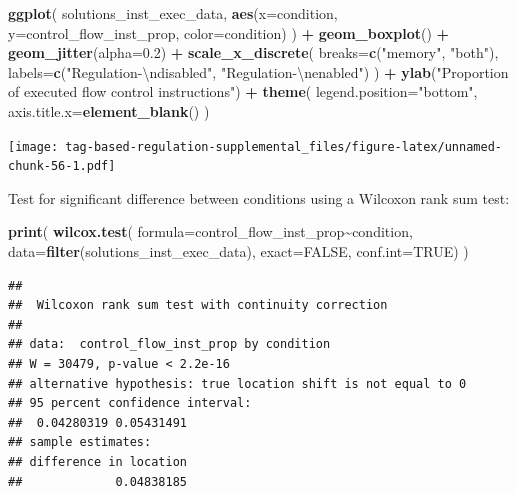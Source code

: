 \documentclass[
]{book}
\newenvironment{Shaded}{\begin{snugshade}}{\end{snugshade}}
\newcommand{\CharTok}[1]{\textcolor[rgb]{0.31,0.60,0.02}{#1}}
\newcommand{\DataTypeTok}[1]{\textcolor[rgb]{0.13,0.29,0.53}{#1}}
\newcommand{\FloatTok}[1]{\textcolor[rgb]{0.00,0.00,0.81}{#1}}
\newcommand{\KeywordTok}[1]{\textcolor[rgb]{0.13,0.29,0.53}{\textbf{#1}}}
\newcommand{\NormalTok}[1]{#1}
\newcommand{\OperatorTok}[1]{\textcolor[rgb]{0.81,0.36,0.00}{\textbf{#1}}}
\newcommand{\OtherTok}[1]{\textcolor[rgb]{0.56,0.35,0.01}{#1}}
\newcommand{\StringTok}[1]{\textcolor[rgb]{0.31,0.60,0.02}{#1}}
\begin{document}
\begin{Shaded}
\begin{Highlighting}[]
\KeywordTok{ggplot}\NormalTok{( solutions\_inst\_exec\_data, }\KeywordTok{aes}\NormalTok{(}\DataTypeTok{x=}\NormalTok{condition, }\DataTypeTok{y=}\NormalTok{control\_flow\_inst\_prop, }\DataTypeTok{color=}\NormalTok{condition) ) }\OperatorTok{+}
\StringTok{  }\KeywordTok{geom\_boxplot}\NormalTok{() }\OperatorTok{+}
\StringTok{  }\KeywordTok{geom\_jitter}\NormalTok{(}\DataTypeTok{alpha=}\FloatTok{0.2}\NormalTok{) }\OperatorTok{+}
\StringTok{  }\KeywordTok{scale\_x\_discrete}\NormalTok{(}
    \DataTypeTok{breaks=}\KeywordTok{c}\NormalTok{(}\StringTok{"memory"}\NormalTok{, }\StringTok{"both"}\NormalTok{),}
    \DataTypeTok{labels=}\KeywordTok{c}\NormalTok{(}\StringTok{"Regulation{-}}\CharTok{\textbackslash{}n}\StringTok{disabled"}\NormalTok{, }\StringTok{"Regulation{-}}\CharTok{\textbackslash{}n}\StringTok{enabled"}\NormalTok{)}
\NormalTok{  ) }\OperatorTok{+}
\StringTok{  }\KeywordTok{ylab}\NormalTok{(}\StringTok{"Proportion of executed flow control instructions"}\NormalTok{) }\OperatorTok{+}
\StringTok{  }\KeywordTok{theme}\NormalTok{(}
    \DataTypeTok{legend.position=}\StringTok{"bottom"}\NormalTok{,}
    \DataTypeTok{axis.title.x=}\KeywordTok{element\_blank}\NormalTok{()}
\NormalTok{  )}
\end{Highlighting}
\end{Shaded}

\texttt{[image: tag-based-regulation-supplemental\_files/figure-latex/unnamed-chunk-56-1.pdf]}

Test for significant difference between conditions using a Wilcoxon rank sum test:

\begin{Shaded}
\begin{Highlighting}[]
\KeywordTok{print}\NormalTok{(}
  \KeywordTok{wilcox.test}\NormalTok{(}
    \DataTypeTok{formula=}\NormalTok{control\_flow\_inst\_prop}\OperatorTok{\textasciitilde{}}\NormalTok{condition,}
    \DataTypeTok{data=}\KeywordTok{filter}\NormalTok{(solutions\_inst\_exec\_data),}
    \DataTypeTok{exact=}\OtherTok{FALSE}\NormalTok{,}
    \DataTypeTok{conf.int=}\OtherTok{TRUE}\NormalTok{)}
\NormalTok{)}
\end{Highlighting}
\end{Shaded}

\begin{verbatim}
## 
##  Wilcoxon rank sum test with continuity correction
## 
## data:  control_flow_inst_prop by condition
## W = 30479, p-value < 2.2e-16
## alternative hypothesis: true location shift is not equal to 0
## 95 percent confidence interval:
##  0.04280319 0.05431491
## sample estimates:
## difference in location 
##             0.04838185
\end{verbatim}
\end{document}

